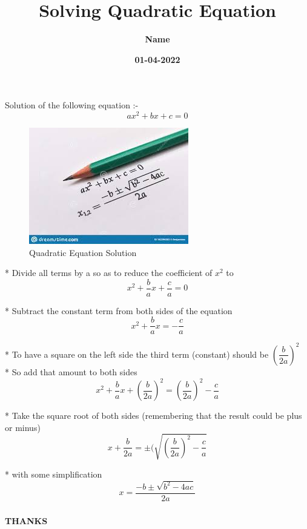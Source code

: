\documentclass{beamer}
\title{\color{red}\textbf{Solving Quadratic Equation}}
\author{\color{yellow}\textbf{Name}}
\institute{\color{green}\textbf{DU}}
\date{\color{purple}\textbf{01-04-2022}}
\begin{document}
\frame{\titlepage}

\begin{frame}
\centering
\frametitle{}{\color{orange}Solution of the following equation :- $$ax^{2} + bx + c =0 $$}

\begin{figure}
    \centering
    \includegraphics[width = 0.5 \textwidth]{solu.jpg}
    \caption{Quadratic Equation Solution}
    \label{fig:my_label}
\end{figure}


\end{frame}
\begin{frame}

* Divide all terms by a so as to reduce the coefficient of $x^{2}$ to
$$x^{2} + \dfrac{b}{a}x + \dfrac{c}{a} = 0$$

* Subtract the constant term from both sides of the equation
$$ x^{2} + \dfrac{b}{a}x = -\dfrac{c}{a}$$

* To have a square on the left side the third term (constant) should be
$(\dfrac{b}{2a})^{2}$\\

* So add that amount to both sides
$$x^{2} +\dfrac{b}{a}x + (\dfrac{b}{2a})^{2} =  (\dfrac{b}{2a})^{2} -\dfrac{c}{a}  $$
\end{frame}

\begin{frame}


* Take the square root of both sides (remembering that the result could be plus or minus)
$$x + \dfrac{b}{2a} = \pm(\sqrt{(\dfrac{b}{2a})^{2} -\dfrac{c}{a}} $$

* with some simplification
$$ x = \dfrac{-b \pm \sqrt{b^{2} -4ac}}{2a} $$





\centering
\frametitle{}{\color{violet}\textbf{THANKS}}
\end{frame}
\end{document}
